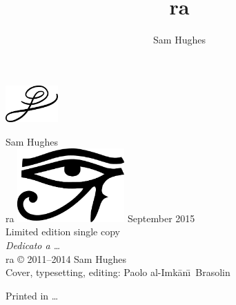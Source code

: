 \documentclass[ 10pt
              , showtrims
              ]{memoir}
\author{Sam Hughes}
\title{ra}
\newcommand{\makechapters}{
  \cleartorecto
  
  \clearpage
}
\begin{document}
  \frontmatter
    \pagestyle{empty}
    \null\cleartorecto
    \begingroup\centering
      \vspace*{\fill}\includegraphics[height=40pt]{glyph}\par
    \endgroup
    \cleartorecto\thispagestyle{empty}
    \begingroup\centering
      \null\bigskip
      {\huge Sam Hughes}\\%
      \bigskip%
      {\fontsize{50pt}{60pt}\ttfamily ra}%
      \vfill
      \includegraphics[height=80pt]{wadjet}
      \vfill
    \endgroup
    \clearpage\thispagestyle{empty}
    \begingroup\centering
      \vfill
      September 2015\\
      Limited edition single copy\\
      \bigskip
      \emph{Dedicato a \ldots}\\
      \vfill
      {\ttfamily ra} © 2011--2014 Sam Hughes\\
      Cover, typesetting, editing: Paolo al-Imk\=an\=\i\ Brasolin\par
    \endgroup
    \cleartorecto
    \tableofcontents*
  \mainmatter
    \lipsum\lipsum\lipsum%
  \backmatter
    \pagestyle{empty}
    \cleartorecto
    \cleartoverso
    \begin{vplace}[0.5]
      \centering
      Printed in \ldots
    \end{vplace}
    \cleartoverso\null
\end{document}

